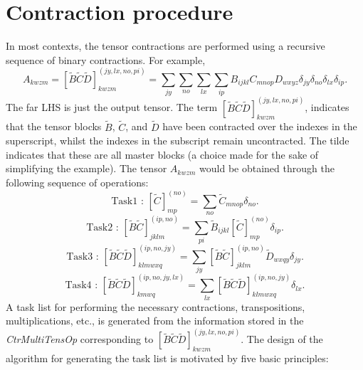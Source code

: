 \section{Contraction procedure } 
\noindent In most contexts, the tensor contractions are performed using a recursive sequence of binary contractions. For example,
\begin{equation}
A_{kwzm} = 
[\tilde{B}\tilde{C}\tilde{D}]^{(jy,lx,no,pi)}_{kwzm} = \sum_{jy}\sum_{no}\sum_{lx}\sum_{ip} B_{ijkl}C_{mnop}D_{wxyz} \delta_{jy} \delta_{no} \delta_{lx}\delta_{ip}.
\end{equation}
The far LHS is just the output tensor. 
The term $[\tilde{B}\tilde{C}\tilde{D}]^{(jy,lx,no,pi)}_{kwzm}$, indicates that the tensor blocks
$\tilde{B}$, $\tilde{C}$, and $\tilde{D}$ have been contracted over the indexes in the superscript, whilst
the indexes in the subscript remain uncontracted. The tilde indicates that these are
all master blocks (a choice made for the sake of simplifying the example). 
The tensor $A_{kwzm}$ would be obtained through the following sequence of operations:
\begin{equation}
\text{Task1 \ : \ \ }
[\tilde{C}]^{(no)}_{mp} = \sum_{no} \tilde{C}_{mnop}\delta_{no}.
\label{eqn:ctr_list_t1}
\end{equation}
\begin{equation}
\text{Task2 \ : \ \ }
[\tilde{B}\tilde{C}]^{(ip,no)}_{jklm} = \sum_{pi} \tilde{B}_{ijkl}[\tilde{C}]_{mp}^{(no)}\delta_{ip}.
\label{eqn:ctr_list_t2}
\end{equation}
\begin{equation}
\text{Task3 \ : \ \ }
[\tilde{B}\tilde{C}\tilde{D}]^{(ip,no,jy)}_{klmwxq} = \sum_{jy} [\tilde{B}\tilde{C}]^{(ip,no)}_{jklm}
 \tilde{D}_{wxqy}\delta_{jy}.
\label{eqn:ctr_list_t3}
\end{equation}
\begin{equation}
\text{Task4 \ : \ \ }
[\tilde{B}\tilde{C}\tilde{D}]^{(ip,no,jy,lx)}_{kmwq} = \sum_{lx}
[\tilde{B}\tilde{C}\tilde{D}]^{(ip,no,jy)}_{klmwxq}\delta_{lx}.
\label{eqn:ctr_list_t4}
\end{equation}
A task list for performing the necessary contractions, transpositions, multiplications, etc.,
is generated from the information stored in the \emph{CtrMultiTensOp} corresponding to $[\tilde{B}\tilde{C}\tilde{D}]^{(jy,lx,no,pi)}_{kwzm}$.
The design of the algorithm for generating the task list is motivated by five basic principles: 
